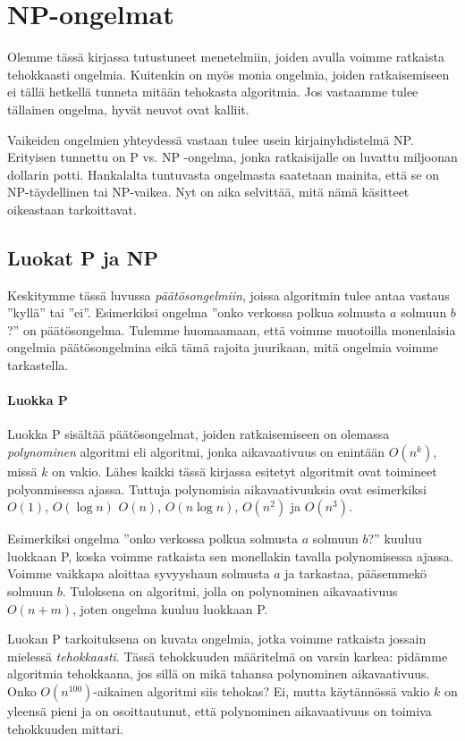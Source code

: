 \chapter{NP-ongelmat}

Olemme tässä kirjassa tutustuneet menetelmiin, joiden avulla voimme
ratkaista tehokkaasti ongelmia.
Kuitenkin on myös monia ongelmia, joiden ratkaisemiseen ei tällä
hetkellä tunneta mitään tehokasta algoritmia.
Jos vastaamme tulee tällainen ongelma, hyvät neuvot ovat kalliit.

Vaikeiden ongelmien yhteydessä vastaan tulee usein
kirjainyhdistelmä NP.
Erityisen tunnettu on P vs. NP -ongelma,
jonka ratkaisijalle on luvattu miljoonan dollarin potti.
Hankalalta tuntuvasta ongelmasta saatetaan mainita, että
se on NP-täydellinen tai NP-vaikea.
Nyt on aika selvittää, mitä nämä käsitteet oikeastaan tarkoittavat.

\section{Luokat P ja NP}

Keskitymme tässä luvussa \emph{päätösongelmiin}, joissa algoritmin tulee
antaa vastaus ''kyllä'' tai ''ei''.
Esimerkiksi ongelma 
''onko verkossa polkua solmusta $a$ solmuun $b$?'' on päätösongelma.
Tulemme huomaamaan, että voimme muotoilla monenlaisia ongelmia
päätösongelmina eikä tämä rajoita juurikaan, mitä ongelmia voimme tarkastella.

\subsubsection{Luokka P}

Luokka P sisältää päätösongelmat, joiden ratkaisemiseen on
olemassa \emph{polynominen} algoritmi eli algoritmi, jonka aikavaativuus
on enintään $O(n^k)$, missä $k$ on vakio.
Lähes kaikki tässä kirjassa esitetyt algoritmit
ovat toimineet polyonmisessa ajassa.
Tuttuja polynomisia aikavaativuuksia ovat esimerkiksi
$O(1)$, $O(\log n)$ $O(n)$, $O(n \log n)$, $O(n^2)$ ja $O(n^3)$.

Esimerkiksi ongelma ''onko verkossa polkua solmusta $a$ solmuun $b$?''
kuuluu luokkaan P, koska voimme ratkaista sen monellakin tavalla
polynomisessa ajassa.
Voimme vaikkapa aloittaa syvyyshaun solmusta $a$ ja tarkastaa,
pääsemmekö solmuun $b$.
Tuloksena on algoritmi, jolla on polynominen aikavaativuus
$O(n+m)$, joten ongelma kuuluu luokkaan P.

Luokan P tarkoituksena on kuvata ongelmia, jotka voimme
ratkaista jossain mielessä \emph{tehokkaasti}.
Tässä tehokkuuden määritelmä on varsin karkea:
pidämme algoritmia tehokkaana, jos sillä on mikä tahansa
polynominen aikavaativuus.
Onko $O(n^{100})$-aikainen algoritmi siis tehokas?
Ei, mutta käytännössä vakio $k$ on yleensä pieni ja
on osoittautunut, että polynominen aikavaativuus 
on toimiva tehokkuuden mittari.


